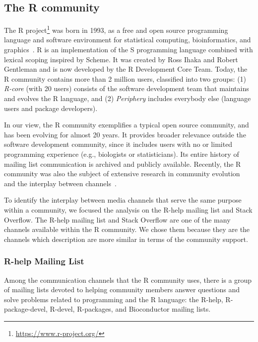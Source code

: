 \documentclass{sig-alternate-05-2015}
\begin{document}
\subsection{The R community}

	The R project\footnote{\url{https://www.r-project.org/}} was born in 1993, as a free and open source programming language and software environment for statistical computing, bioinformatics, and graphics~\cite{Ihaka1996}. 
	R is an implementation of the S programming language combined with lexical scoping inspired by Scheme. 
	It was created by Ross Ihaka and Robert Gentleman and is now developed by the R Development Core Team.
	Today, the R community contains more than 2 million users, classified into two groups: (1) \textit{R-core} (with 20 users) consists of the software development team that maintains and evolves the R language, and (2) \textit{Periphery} includes everybody else (language users and package developers).

	In our view, the R community exemplifies a typical open source community, and has been evolving for almost 20 years.
	It provides broader relevance outside the software development community, since it includes users with no or limited programming experience (e.g., biologists or statisticians). 
	Its entire history of mailing list communication is archived and publicly available.
	Recently, the R community was also the subject of extensive research in community evolution~\cite{German2013} and the interplay between channels~\cite{Vasilescu2014c}. 

	To identify the interplay between media channels that serve the same purpose within a community, we focused the analysis on the R-help mailing list and Stack Overflow.
	The R-help mailing list and Stack Overflow are one of the many channels available within the R community.
	We chose them because they are the channels which description are more similar in terms of the community support.

\subsubsection{R-help Mailing List}

	Among the communication channels that the R community uses, there is a group of mailing lists devoted to helping community members answer questions and solve problems related to programming and the R language: the R-help, R-package-devel, R-devel, R-packages, and Bioconductor mailing lists.
\end{document}
